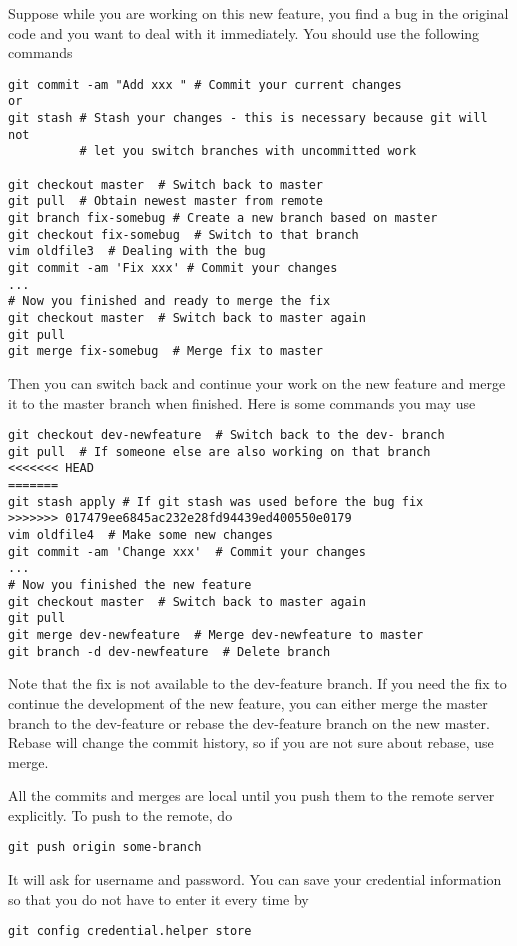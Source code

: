 \documentclass[runningheads,letterpaper]{llncs}
\begin{document}
Suppose while you are working on this new feature, you find a bug in the original code and
you want to deal with it immediately. You should use the following commands
\begin{verbatim}
git commit -am "Add xxx " # Commit your current changes
or
git stash # Stash your changes - this is necessary because git will not
          # let you switch branches with uncommitted work

git checkout master  # Switch back to master
git pull  # Obtain newest master from remote
git branch fix-somebug # Create a new branch based on master
git checkout fix-somebug  # Switch to that branch
vim oldfile3  # Dealing with the bug
git commit -am 'Fix xxx' # Commit your changes
...
# Now you finished and ready to merge the fix
git checkout master  # Switch back to master again
git pull
git merge fix-somebug  # Merge fix to master
\end{verbatim}

Then you can switch back and continue your work on the new feature and merge it to the master branch when finished.
Here is some commands you may use
\begin{verbatim}
git checkout dev-newfeature  # Switch back to the dev- branch
git pull  # If someone else are also working on that branch
<<<<<<< HEAD
=======
git stash apply # If git stash was used before the bug fix
>>>>>>> 017479ee6845ac232e28fd94439ed400550e0179
vim oldfile4  # Make some new changes
git commit -am 'Change xxx'  # Commit your changes
...
# Now you finished the new feature
git checkout master  # Switch back to master again
git pull
git merge dev-newfeature  # Merge dev-newfeature to master
git branch -d dev-newfeature  # Delete branch
\end{verbatim}

Note that the fix is not available to the dev-feature branch.
If you need the fix to continue the development of the new feature, you can either merge the master branch to the dev-feature or rebase the dev-feature branch on the new master.
Rebase will change the commit history, so if you are not sure about rebase, use merge.

All the commits and merges are local until you push them to the remote server explicitly.
To push to the remote, do
\begin{verbatim}
git push origin some-branch
\end{verbatim}
It will ask for username and password.
You can save your credential information so that you do not have to enter it every time by
\begin{verbatim}
git config credential.helper store
\end{verbatim}
\end{document}
